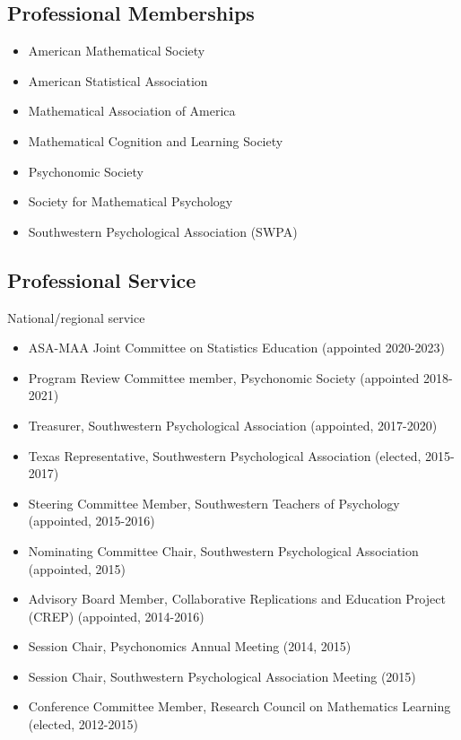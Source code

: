 \documentclass[article,10pt]{article}
\begin{document}
\subsection*{Professional Memberships}
\label{sec:orga2413de}
\begin{itemize}
\item American Mathematical Society
\item American Statistical Association
\item Mathematical Association of America
\item Mathematical Cognition and Learning Society
\item Psychonomic Society
\item Society for Mathematical Psychology
\item Southwestern Psychological Association (SWPA)
\end{itemize}

\subsection*{Professional Service}
\label{sec:org276545b}

National/regional service 

\begin{itemize}
\item ASA-MAA Joint Committee on Statistics Education (appointed 2020-2023)
\item Program Review Committee member, Psychonomic Society (appointed 2018-2021)
\item Treasurer, Southwestern Psychological Association (appointed, 2017-2020)
\item Texas Representative, Southwestern Psychological Association (elected, 2015-2017)
\item Steering Committee Member, Southwestern Teachers of Psychology (appointed, 2015-2016)
\item Nominating Committee Chair, Southwestern Psychological Association (appointed, 2015)
\item Advisory Board Member, Collaborative Replications and Education Project (CREP) (appointed, 2014-2016)
\item Session Chair, Psychonomics Annual Meeting (2014, 2015)
\item Session Chair, Southwestern Psychological Association Meeting (2015)
\item Conference Committee Member, Research Council on Mathematics Learning (elected, 2012-2015)
\end{itemize}
\end{document}
